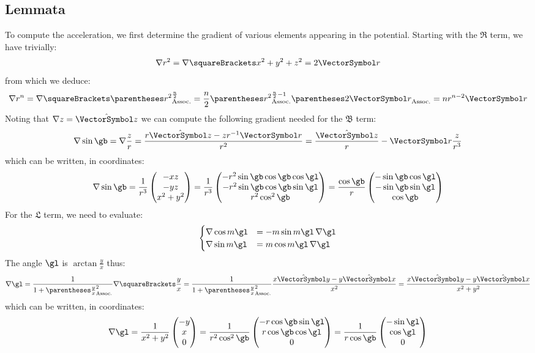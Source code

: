 \documentclass[10pt, a4paper, twoside]{basestyle}
\begin{document}
\subsection*{Lemmata}
To compute the acceleration, we first determine the gradient of various elements appearing in the potential.  Starting with the $\mathfrak R$ term, we have trivially:
\[
\grad r^2 = \grad\of{x^2 + y^2 + z^2} = 2 \vr
\]
from which we deduce:
\[
\grad r^n = \grad\of{\pa{r^2}^{\frac{n}{2}}} = \frac{n}{2}\pa{r^2}^{\frac{n}{2} - 1}\pa{2 \vr} = n r^{n - 2} \vr
\]
Noting that $\grad z = \hat{\vz}$ we can compute the following gradient needed for the $\mathfrak B$ term:
\[
\grad \sin \gb = \grad \frac{z}{r}
= \frac{r \hat{\vz} - z r^{-1} \vr}{r^2} = \frac{\hat{\vz}}{r} - \vr \frac{z}{r^3}
\]
which can be written, in coordinates:
\[
\grad \sin \gb =\frac{1}{r^3}\begin{pmatrix}
-x z \\ -y z \\ x^2 + y^2
\end{pmatrix}
=\frac{1}{r^3}\begin{pmatrix}
-r^2 \sin \gb \cos \gb \cos \gl \\
-r^2 \sin \gb \cos \gb \sin \gl \\
r^2 \cos^2 \gb
\end{pmatrix}
=\frac{\cos \gb}{r}\begin{pmatrix}
-\sin \gb \cos \gl \\
-\sin \gb \sin \gl \\
\cos \gb
\end{pmatrix}
\]
For the $\mathfrak L$ term, we need to evaluate:
\[
\begin{cases}
\grad \cos m \gl &= -m \sin m \gl \, \grad \gl \\
\grad \sin m \gl &= m \cos m \gl \, \grad \gl
\end{cases}
\]
The angle $\gl$ is $\arctan\frac{y}{x}$ thus:
\[
\grad \gl = \frac{1}{1 + \pa{\frac{y}{x}}^2} \grad\of{\frac{y}{x}}
= \frac{1}{1 + \pa{\frac{y}{x}}^2}\frac{x \hat{\vy} - y \hat{\vx}}{x^2}
= \frac{x \hat{\vy} - y \hat{\vx}}{x^2 + y^2}
\]
which can be written, in coordinates:
\[
\grad \gl = \frac{1}{x^2 + y^2}\begin{pmatrix}
-y \\
x \\
0
\end{pmatrix}
= \frac{1}{r^2 \cos^2 \gb}\begin{pmatrix}
-r \cos \gb \sin \gl \\
r \cos \gb \cos \gl \\
0
\end{pmatrix}
= \frac{1}{r \cos \gb}\begin{pmatrix}
-\sin \gl \\
\cos \gl \\
0
\end{pmatrix}
\]
\end{document}
